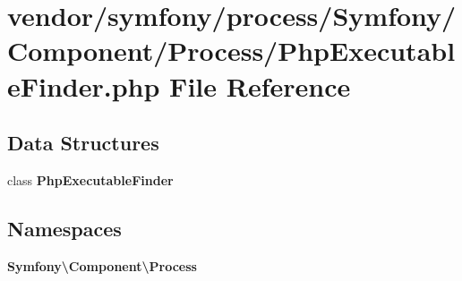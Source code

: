 \section{vendor/symfony/process/\+Symfony/\+Component/\+Process/\+Php\+Executable\+Finder.php File Reference}
\label{_php_executable_finder_8php}
\subsection*{Data Structures}
\begin{DoxyCompactItemize}
\item 
class {\bf Php\+Executable\+Finder}
\end{DoxyCompactItemize}
\subsection*{Namespaces}
\begin{DoxyCompactItemize}
\item 
 {\bf Symfony\textbackslash{}\+Component\textbackslash{}\+Process}
\end{DoxyCompactItemize}
